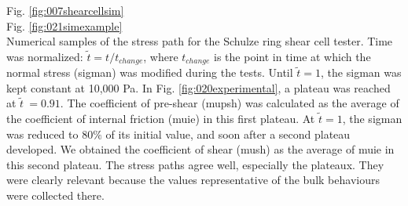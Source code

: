 Fig. \ref{fig:007shearcellsim} \\


Fig. \ref{fig:021simexample} \\


Numerical samples of the stress path
    for the Schulze ring shear cell tester.
	Time was normalized: $\tilde{t} = t/t_{change}$, where $t_{change}$ is the
	point in time at which the normal stress (\acs{sigman}) was modified during the
	tests.
	Until $\tilde{t}=1$, the \acs{sigman} was kept constant at 10,000 Pa.
	In Fig. \ref{fig:020experimental},
 	a plateau was reached at $\tilde{t}~=0.91$.
	The coefficient of pre-shear (\acs{mupsh}) was calculated as the average of the
	coefficient of internal friction (\acs{muie}) in this first plateau.
	At $\tilde{t}=1$, the \acs{sigman} was reduced to $80 \%$ of its initial
	value, and soon after
	a second plateau developed.
	We obtained the coefficient of
	shear (\acs{mush}) as the average of \acs{muie} in this second plateau.
	The stress paths agree well, especially the plateaux.
	They were clearly relevant because
	the values representative of the bulk behaviours
	were collected there.